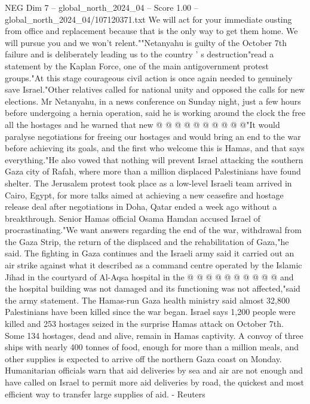 \begin{textsample}{NEG Dim 7 – global\_north\_2024\_04 – Score 1.00 – global\_north\_2024\_04/107120371.txt}
We will act for your immediate ousting from office and replacement because that is the only way to get them home.
We will pursue you and we won't relent.""Netanyahu is guilty of the October 7th failure and is deliberately leading us to the country ' s destruction"read a statement by the Kaplan Force, one of the main antigovernment protest groups."At this stage courageous civil action is once again needed to genuinely save Israel."Other relatives called for national unity and opposed the calls for new elections.
Mr Netanyahu, in a news conference on Sunday night, just a few hours before undergoing a hernia operation, said he is working around the clock the free all the hostages and he warned that new @ @ @ @ @ @ @ @ @ @"It would paralyse negotiations for freeing our hostages and would bring an end to the war before achieving its goals, and the first who welcome this is Hamas, and that says everything."He also vowed that nothing will prevent Israel attacking the southern Gaza city of Rafah, where more than a million displaced Palestinians have found shelter.
The Jerusalem protest took place as a low-level Israeli team arrived in Cairo, Egypt, for more talks aimed at achieving a new ceasefire and hostage release deal after negotiations in Doha, Qatar ended a week ago without a breakthrough.
Senior Hamas official Osama Hamdan accused Israel of procrastinating."We want answers regarding the end of the war, withdrawal from the Gaza Strip, the return of the displaced and the rehabilitation of Gaza,"he said.
The fighting in Gaza continues and the Israeli army said it carried out an air strike against what it described as a command centre operated by the Islamic Jihad in the courtyard of Al-Aqsa hospital in the @ @ @ @ @ @ @ @ @ @ and the hospital building was not damaged and its functioning was not affected,"said the army statement.
The Hamas-run Gaza health ministry said almost 32,800 Palestinians have been killed since the war began.
Israel says 1,200 people were killed and 253 hostages seized in the surprise Hamas attack on October 7th.
Some 134 hostages, dead and alive, remain in Hamas captivity.
A convoy of three ships with nearly 400 tonnes of food, enough for more than a million meals, and other supplies is expected to arrive off the northern Gaza coast on Monday.
Humanitarian officials warn that aid deliveries by sea and air are not enough and have called on Israel to permit more aid deliveries by road, the quickest and most efficient way to transfer large supplies of aid. - Reuters

\end{textsample}
